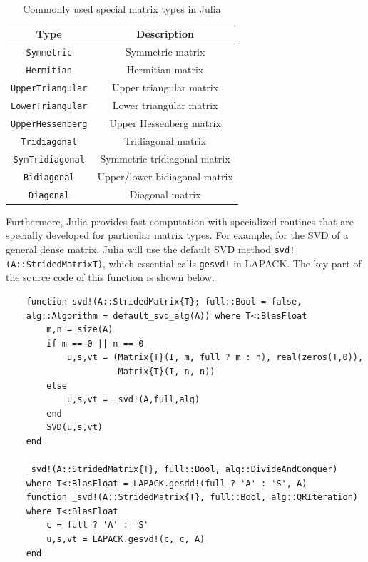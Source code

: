 \begin{enumerate}
\begin{itemize}
    \begin{table}[H]
    	\centering
    \begin{tabular}{|| c | c ||} \hline
    Type & Description \\ \hline\hline
    {\tt Symmetric}	& Symmetric matrix \\ \hline
    {\tt Hermitian}	& Hermitian matrix \\ \hline
    {\tt UpperTriangular} & Upper triangular matrix \\ \hline
    {\tt LowerTriangular} & Lower triangular matrix \\ \hline
    {\tt UpperHessenberg} & Upper Hessenberg matrix \\ \hline
    {\tt Tridiagonal} & Tridiagonal matrix \\ \hline
    {\tt SymTridiagonal} & Symmetric tridiagonal matrix \\ \hline
    {\tt Bidiagonal} & Upper/lower bidiagonal matrix \\ \hline
    {\tt Diagonal} & Diagonal matrix \\ \hline\hline
    \end{tabular}
	\caption{Commonly used special matrix types 
in Julia} \label{freq-mat}
	\end{table}
	
	Furthermore, Julia provides fast computation with specialized 
    routines that are specially developed for particular matrix types. 
    For example, for the SVD of a general dense matrix, Julia will use the default 
    SVD method {\tt svd!(A::StridedMatrix{T})}, which essential calls {\tt gesvd!} in LAPACK.
    The key part of the source code of this function is shown below.
    
    \begin{verbatim}
    function svd!(A::StridedMatrix{T}; full::Bool = false, 
    alg::Algorithm = default_svd_alg(A)) where T<:BlasFloat
        m,n = size(A)
        if m == 0 || n == 0
            u,s,vt = (Matrix{T}(I, m, full ? m : n), real(zeros(T,0)), 
                      Matrix{T}(I, n, n))
        else
            u,s,vt = _svd!(A,full,alg)
        end
        SVD(u,s,vt)
    end

    _svd!(A::StridedMatrix{T}, full::Bool, alg::DivideAndConquer) 
    where T<:BlasFloat = LAPACK.gesdd!(full ? 'A' : 'S', A)
    function _svd!(A::StridedMatrix{T}, full::Bool, alg::QRIteration) 
    where T<:BlasFloat
        c = full ? 'A' : 'S'
        u,s,vt = LAPACK.gesvd!(c, c, A)
    end
    \end{verbatim}
    

\end{itemize}
\end{enumerate}
